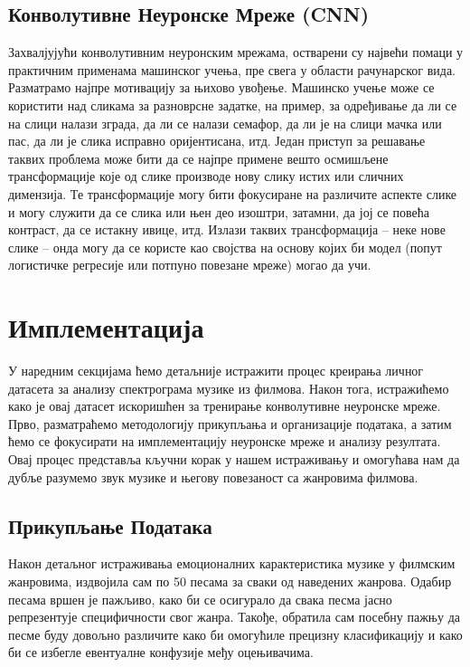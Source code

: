 \documentclass{article}
\begin{document}
\subsection{Конволутивне Неуронске Мреже (CNN)}
Захвалјујући конволутивним неуронским мрежама, остварени су највећи помаци у практичним применама машинског учења, пре свега у области рачунарског
вида.
 Разматрамо најпре мотивацију за њихово увођење.
Машинско учење може се користити над сликама за разноврсне задатке, на
пример, за одређивање да ли се на слици налази зграда, да ли се налази семафор, да
ли је на слици мачка или пас, да ли је слика исправно оријентисана, итд. Један приступ
за решавање таквих проблема може бити да се најпре примене вешто осмишљене
трансформације које од слике производе нову слику истих или сличних димензија. Те
трансформације могу бити фокусиране на различите аспекте слике и могу служити да се
слика или њен део изоштри, затамни, да јој се повећа контраст, да се истакну ивице,
итд. Излази таквих трансформација – неке нове слике – онда могу да се користе
као својства на основу којих би модел (попут логистичке регресије или потпуно
повезане мреже) могао да учи.


\section{Имплементација}
У наредним секцијама ћемо детаљније истражити процес креирања личног датасета за анализу спектрограма музике из филмова. Након тога, истражићемо како је овај датасет искоришћен за тренирање конволутивне неуронске мреже. Прво, разматраћемо методологију прикупљања и организације података, а затим ћемо се фокусирати на имплементацију неуронске мреже и анализу резултата. Овај процес представља кључни корак у нашем истраживању и омогућава нам да дубље разумемо звук музике и његову повезаност са жанровима филмова.

\subsection{Прикупљање Података}
Након детаљног истраживања емоционалних карактеристика музике у филмским жанровима, издвојила сам по 50 песама за сваки од наведених жанрова. Одабир песама вршен је пажљиво, како би се осигурало да свака песма јасно репрезентује специфичности свог жанра. Такође, обратила сам посебну пажњу да песме буду довољно различите како би омогућиле прецизну класификацију и како би се избегле евентуалне конфузије међу оцењивачима.
\end{document}
